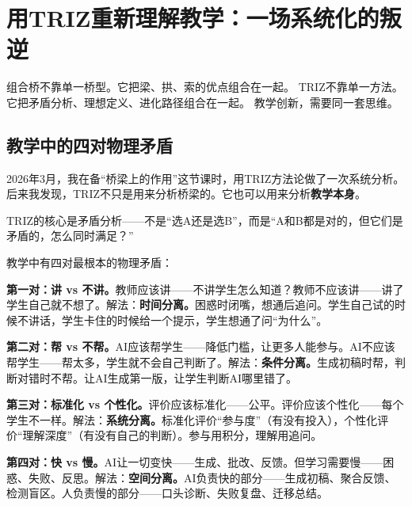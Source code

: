 
\chapter{用TRIZ重新理解教学：一场系统化的叛逆}

\vspace{0.5cm}

\begin{center}
{\small\color{muted} 组合桥不靠单一桥型。它把梁、拱、索的优点组合在一起。}
{\small\color{muted} TRIZ不靠单一方法。它把矛盾分析、理想定义、进化路径组合在一起。}
{\small\color{muted} 教学创新，需要同一套思维。}
\end{center}

\vspace{1cm}

\section{教学中的四对物理矛盾}

2026年3月，我在备``桥梁上的作用''这节课时，用TRIZ方法论做了一次系统分析。后来我发现，TRIZ不只是用来分析桥梁的。它也可以用来分析\textbf{教学本身}。

TRIZ的核心是矛盾分析——不是``选A还是选B''，而是``A和B都是对的，但它们是矛盾的，怎么同时满足？''

教学中有四对最根本的物理矛盾：

\textbf{第一对：讲 vs 不讲。}教师应该讲——不讲学生怎么知道？教师不应该讲——讲了学生自己就不想了。解法：\textbf{时间分离。}困惑时闭嘴，想通后追问。学生自己试的时候不讲话，学生卡住的时候给一个提示，学生想通了问``为什么''。

\textbf{第二对：帮 vs 不帮。}AI应该帮学生——降低门槛，让更多人能参与。AI不应该帮学生——帮太多，学生就不会自己判断了。解法：\textbf{条件分离。}生成初稿时帮，判断对错时不帮。让AI生成第一版，让学生判断AI哪里错了。

\textbf{第三对：标准化 vs 个性化。}评价应该标准化——公平。评价应该个性化——每个学生不一样。解法：\textbf{系统分离。}标准化评价``参与度''（有没有投入），个性化评价``理解深度''（有没有自己的判断）。参与用积分，理解用追问。

\textbf{第四对：快 vs 慢。}AI让一切变快——生成、批改、反馈。但学习需要慢——困惑、失败、反思。解法：\textbf{空间分离。}AI负责快的部分——生成初稿、聚合反馈、检测盲区。人负责慢的部分——口头诊断、失败复盘、迁移总结。

